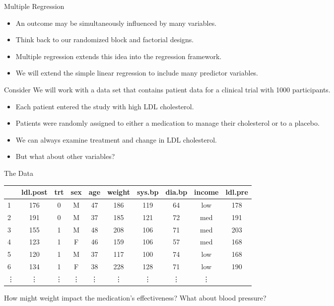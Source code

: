 \begin{frame}{Multiple Regression}
    \begin{itemize}
        \item An outcome may be simultaneously influenced by many variables.
        \item Think back to our randomized block and factorial designs.
        \item Multiple regression extends this idea into the regression framework.
        \item We will extend the simple linear regression to include many predictor variables.
    \end{itemize}
\end{frame}

\begin{frame}{Consider}
    We will work with a data set that contains patient data for a clinical trial with 1000 participants. 
    \begin{itemize}
        \item Each patient entered the study with high LDL cholesterol.
        \item Patients were randomly assigned to either a medication to manage their cholesterol or to a placebo. 
        \item We can always examine treatment and change in LDL cholesterol.
        \item But what about other variables? 
    \end{itemize}
\end{frame}

\begin{frame}{The Data}
    \begin{table}[h]
        \centering\small
        \begin{tabular}{lccccccccc}
            \hline
             & ldl.post & trt & sex & age & weight & sys.bp & dia.bp & income & ldl.pre \\
            \hline
            1 & 176   & 0 &  M & 47  &  186  &  119  &   64   & low & 178 \\
            2 & 191  &  0 &  M & 37  &  185  &  121  &   72   & med & 191 \\
            3 & 155  &  1 &  M & 48  &  208   & 106  &   71  & med & 203 \\
            4 & 123  &  1 &  F & 46  &  159   & 106  &   57  & med & 168 \\
            5 & 120  &  1 &  M & 37  &  117  &  100  &   74  & low & 168 \\
            6 & 134 &   1  & F & 38  &  228 &   128  &   71  & low & 190 \\
            \vdots & \vdots & \vdots & \vdots & \vdots & \vdots & \vdots &   \vdots & \vdots \\
            \hline
        \end{tabular}
    \end{table}
    How might weight impact the medication's effectiveness? What about blood pressure?
\end{frame}


